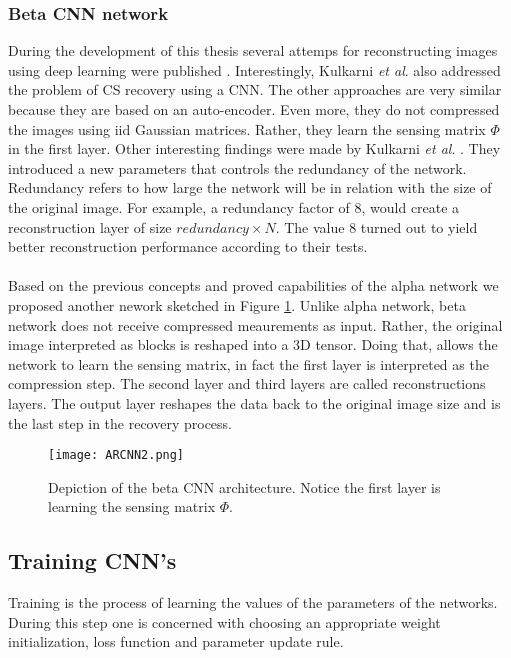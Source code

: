 \subsubsection{Beta CNN network}
During the development of this thesis several attemps for reconstructing images using deep learning were published \cite{kulkarni2016reconnet,mousavi2015deep,iliadis2016deep,iliadis2016deepbinarymask,adler2016deep}. Interestingly, Kulkarni \textit{et al}. \cite{kulkarni2016reconnet} also addressed the problem of CS recovery using a CNN. The other approaches are very similar because they are based on an auto-encoder.  Even more, they do not compressed the images using iid Gaussian matrices. Rather, they learn the sensing matrix $\Phi$ in the first layer. Other interesting findings were made by Kulkarni \textit{et al}. \cite{kulkarni2016reconnet}. They introduced a new parameters that controls the redundancy of the network. Redundancy refers to how large the network will be in relation with the size of the original image. For example, a redundancy factor of 8, would create a reconstruction layer of size $redundancy \times N$. The value 8 turned out to yield better reconstruction performance according to their tests.\\\\
Based on the previous concepts and proved capabilities of the alpha network we proposed another nework sketched in Figure \ref{fig:ARCNNim2}. Unlike alpha network, beta network does not receive compressed meaurements as input. Rather, the original image interpreted as blocks is reshaped into a 3D tensor. Doing that, allows the network to learn the sensing matrix, in fact the first layer is interpreted as the compression step. The second layer and third layers are called reconstructions layers. The output layer reshapes the data back to the original image size and is the last step in the recovery process.         
\begin{figure}[tb] 
\centering 
\texttt{[image: ARCNN2.png]} 
\caption[Beta CNN architecture for recovery ]{Depiction of the beta CNN architecture. Notice the first layer is learning the sensing matrix $\Phi$.}
\label{fig:ARCNNim2} 
\end{figure}

\subsection{Training CNN's}
Training is the process of learning the values of the parameters of the networks. During this step one is concerned with choosing an appropriate weight initialization, loss function and parameter update rule.

